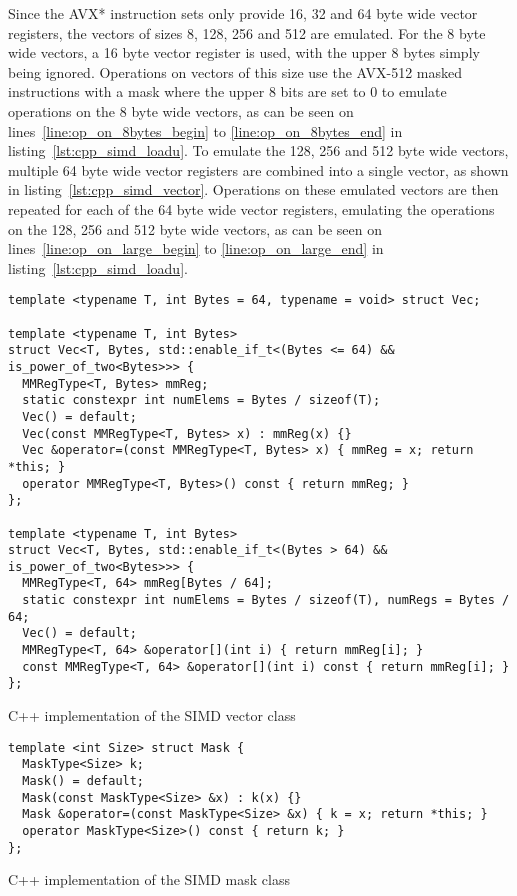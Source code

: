 \documentclass[12pt, a4paper, openright, twoside]{tiarbeit}
\begin{document}
Since the AVX* instruction sets only provide 16, 32 and 64 byte wide vector
registers, the vectors of sizes 8, 128, 256 and 512 are emulated.
For the 8 byte wide vectors, a 16 byte vector register is used, with the upper
8 bytes simply being ignored. Operations on vectors of this size use the AVX-512
masked instructions with a mask where the upper 8 bits are set to 0 to
emulate operations on the 8 byte wide vectors, as can be seen on
lines~\ref{line:op_on_8bytes_begin} to \ref{line:op_on_8bytes_end} in
listing~\ref{lst:cpp_simd_loadu}.
To emulate the 128, 256 and 512 byte wide vectors, multiple 64 byte wide
vector registers are combined into a single vector, as shown in
listing~\ref{lst:cpp_simd_vector}.
Operations on these
emulated vectors are then repeated for each of the 64 byte wide vector
registers, emulating the operations on the 128, 256 and 512 byte wide vectors,
as can be seen on lines~\ref{line:op_on_large_begin} to \ref{line:op_on_large_end}
in listing~\ref{lst:cpp_simd_loadu}.



\begin{listing}[h!]
  \begin{verbatim}
template <typename T, int Bytes = 64, typename = void> struct Vec;

template <typename T, int Bytes>
struct Vec<T, Bytes, std::enable_if_t<(Bytes <= 64) && is_power_of_two<Bytes>>> {
  MMRegType<T, Bytes> mmReg;
  static constexpr int numElems = Bytes / sizeof(T);
  Vec() = default;
  Vec(const MMRegType<T, Bytes> x) : mmReg(x) {}
  Vec &operator=(const MMRegType<T, Bytes> x) { mmReg = x; return *this; }
  operator MMRegType<T, Bytes>() const { return mmReg; }
};

template <typename T, int Bytes>
struct Vec<T, Bytes, std::enable_if_t<(Bytes > 64) && is_power_of_two<Bytes>>> {
  MMRegType<T, 64> mmReg[Bytes / 64];
  static constexpr int numElems = Bytes / sizeof(T), numRegs = Bytes / 64;
  Vec() = default;
  MMRegType<T, 64> &operator[](int i) { return mmReg[i]; }
  const MMRegType<T, 64> &operator[](int i) const { return mmReg[i]; }
};
  \end{verbatim}
  \caption{C++ implementation of the SIMD vector class}
  \label{lst:cpp_simd_vector}
\end{listing}

\begin{listing}[h!]
  \begin{verbatim}
template <int Size> struct Mask {
  MaskType<Size> k;
  Mask() = default;
  Mask(const MaskType<Size> &x) : k(x) {}
  Mask &operator=(const MaskType<Size> &x) { k = x; return *this; }
  operator MaskType<Size>() const { return k; }
};
  \end{verbatim}
  \caption{C++ implementation of the SIMD mask class}
  \label{lst:cpp_simd_mask}
\end{listing}
\end{document}
